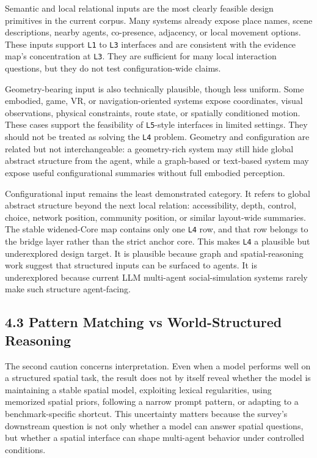 \documentclass[
  twocolumn]{article}
\begin{document}
Semantic and local relational inputs are the most clearly feasible
design primitives in the current corpus. Many systems already expose
place names, scene descriptions, nearby agents, co-presence, adjacency,
or local movement options. These inputs support \texttt{L1} to
\texttt{L3} interfaces and are consistent with the evidence map's
concentration at \texttt{L3}. They are sufficient for many local
interaction questions, but they do not test configuration-wide claims.

Geometry-bearing input is also technically plausible, though less
uniform. Some embodied, game, VR, or navigation-oriented systems expose
coordinates, visual observations, physical constraints, route state, or
spatially conditioned motion. These cases support the feasibility of
\texttt{L5}-style interfaces in limited settings. They should not be
treated as solving the \texttt{L4} problem. Geometry and configuration
are related but not interchangeable: a geometry-rich system may still
hide global abstract structure from the agent, while a graph-based or
text-based system may expose useful configurational summaries without
full embodied perception.

Configurational input remains the least demonstrated category. It refers
to global abstract structure beyond the next local relation:
accessibility, depth, control, choice, network position, community
position, or similar layout-wide summaries. The stable widened-Core map
contains only one \texttt{L4} row, and that row belongs to the bridge
layer rather than the strict anchor core. This makes \texttt{L4} a
plausible but underexplored design target. It is plausible because graph
and spatial-reasoning work suggest that structured inputs can be
surfaced to agents. It is underexplored because current LLM multi-agent
social-simulation systems rarely make such structure agent-facing.

\subsection{4.3 Pattern Matching vs World-Structured
Reasoning}\label{pattern-matching-vs-world-structured-reasoning}

The second caution concerns interpretation. Even when a model performs
well on a structured spatial task, the result does not by itself reveal
whether the model is maintaining a stable spatial model, exploiting
lexical regularities, using memorized spatial priors, following a narrow
prompt pattern, or adapting to a benchmark-specific shortcut. This
uncertainty matters because the survey's downstream question is not only
whether a model can answer spatial questions, but whether a spatial
interface can shape multi-agent behavior under controlled conditions.
\end{document}
